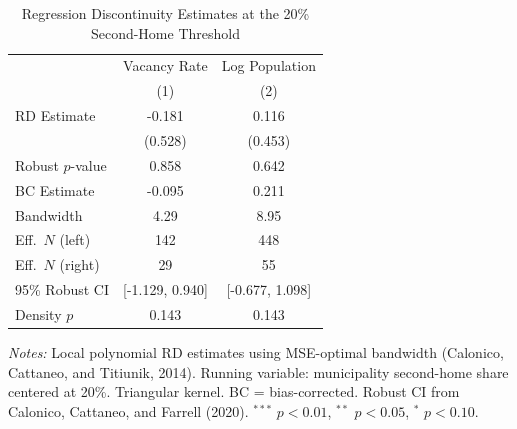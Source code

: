 \begin{table}[htbp]
\centering
\caption{Regression Discontinuity Estimates at the 20\% Second-Home Threshold}
\label{tab:rdd}
\small
\begin{tabular}{lcc}
\toprule
  & Vacancy Rate & Log Population \\
 & (1) & (2) \\
\midrule
RD Estimate & -0.181 & 0.116 \\
  & (0.528) & (0.453) \\[6pt]
Robust $p$-value & 0.858 & 0.642 \\
BC Estimate & -0.095 & 0.211 \\
Bandwidth & 4.29 & 8.95 \\
Eff.\ $N$ (left) & 142 & 448 \\
Eff.\ $N$ (right) & 29 & 55 \\
95\% Robust CI & [-1.129, 0.940] & [-0.677, 1.098] \\
Density $p$ & 0.143 & 0.143 \\
\bottomrule
\end{tabular}
\par\vspace{0.3em}
\begin{minipage}{\linewidth}
\footnotesize \textit{Notes:} Local polynomial RD estimates using MSE-optimal bandwidth (Calonico, Cattaneo, and Titiunik, 2014). Running variable: municipality second-home share centered at 20\%. Triangular kernel. BC = bias-corrected. Robust CI from Calonico, Cattaneo, and Farrell (2020). $^{***}$ $p<0.01$, $^{**}$ $p<0.05$, $^{*}$ $p<0.10$.
\end{minipage}
\end{table}
